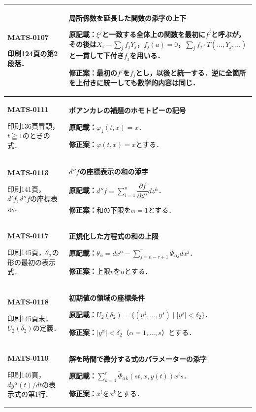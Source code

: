 \documentclass[a4paper,10pt]{ltjsarticle}
\begin{document}
\begin{longtable}{@{}>{\raggedright\arraybackslash}p{.19\linewidth}>{\raggedright\arraybackslash}p{.77\linewidth}@{}}
\hline
\hypertarget{MATS-0107}{}\textbf{MATS-0107}\par 印刷124頁の第2段落． & \textbf{局所係数を延長した関数の添字の上下}\par\textbf{原記載：}$\xi^j$と一致する全体上の関数を最初に$f^j$と呼ぶが，その後は$X_i-\sum_jf_jY_j$，$f_j(a)=0$，$\sum_jf_j\cdot T(\ldots,Y_j,\ldots)$と一貫して下付き$f_j$を用いる．\par\textbf{修正案：}最初の$f^j$を$f_j$とし，以後と統一する．逆に全箇所を上付きに統一しても数学的内容は同じ． \\[3pt]
\hline
\hypertarget{MATS-0111}{}\textbf{MATS-0111}\par 印刷136頁冒頭，$t\geqq1$のときの式． & \textbf{ポアンカレの補題のホモトピーの記号}\par\textbf{原記載：}$\varphi_1(t,x)=x$．\par\textbf{修正案：}$\varphi(t,x)=x$とする． \\[3pt]
\hline
\hypertarget{MATS-0113}{}\textbf{MATS-0113}\par 印刷141頁，$d'f,d''f$の座標表示． & \textbf{$d''f$の座標表示の和の添字}\par\textbf{原記載：}$d''f=\sum_{i=1}^n\dfrac{\partial f}{\partial\bar z^\alpha}dz^{\bar\alpha}$．\par\textbf{修正案：}和の下限を$\alpha=1$とする． \\[3pt]
\hline
\hypertarget{MATS-0117}{}\textbf{MATS-0117}\par 印刷145頁，$\theta_\alpha$の形の最初の表示式． & \textbf{正規化した方程式の和の上限}\par\textbf{原記載：}$\theta_\alpha=dx^\alpha-\sum_{j=n-r+1}^{r}\Phi_{\alpha j}dx^j$．\par\textbf{修正案：}上限$r$を$n$とする． \\[3pt]
\hline
\hypertarget{MATS-0118}{}\textbf{MATS-0118}\par 印刷145頁末，$U_2(\delta_2)$の定義． & \textbf{初期値の領域の座標条件}\par\textbf{原記載：}$U_2(\delta_2)=\{(y^1,\ldots,y^s)\mid|y^s|<\delta_2\}$．\par\textbf{修正案：}$|y^\alpha|<\delta_2$（$\alpha=1,\ldots,s$）とする． \\[3pt]
\hline
\hypertarget{MATS-0119}{}\textbf{MATS-0119}\par 印刷146頁，$dy^\alpha(t)/dt$の表示式の第1行． & \textbf{解を時間で微分する式のパラメーターの添字}\par\textbf{原記載：}$\sum_{k=1}^r\widetilde\Phi_{\alpha k}(st,x,y(t))x^is$．\par\textbf{修正案：}$x^i$を$x^k$とする． \\[3pt]

\end{longtable}
\end{document}
